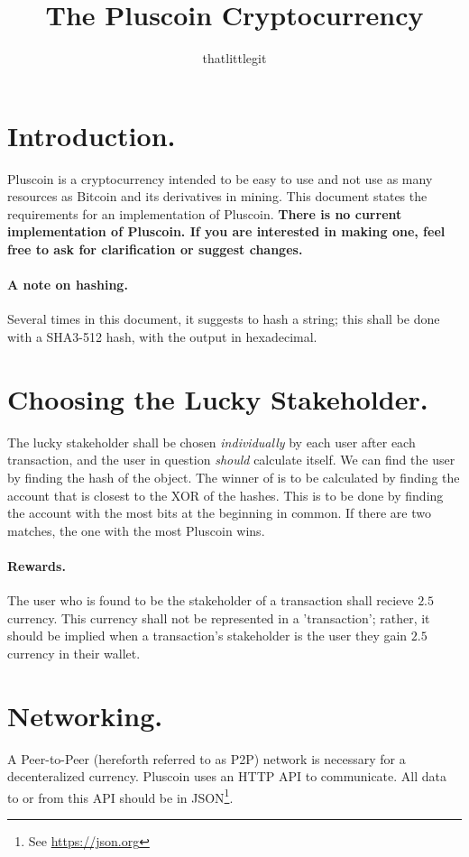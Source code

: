 \documentclass{article}
\title{The Pluscoin Cryptocurrency}
\author{thatlittlegit}
\date{}
\begin{document}
\maketitle
\tableofcontents
\newpage
{}

\section{Introduction.}
Pluscoin is a cryptocurrency intended to be easy to use and not use as many
resources as Bitcoin and its derivatives in mining. This document states the
requirements for an implementation of Pluscoin. \textbf{There is no current
implementation of Pluscoin. If you are interested in making one, feel free
to ask for clarification or suggest changes.}

\paragraph{A note on hashing.} Several times in this document, it suggests to
hash a string; this shall be done with a SHA3-512 hash, with the output in
hexadecimal.

\section{Choosing the Lucky Stakeholder.}
The lucky stakeholder shall be chosen {\it{individually}} by each user after
each transaction, and the user in question {\it{should}} calculate itself. We
can find the user by finding the hash of the object. The winner of is to be
calculated by finding the account that is closest to the XOR of the hashes.
This is to be done by finding the account with the most bits at the beginning
in common. If there are two matches, the one with the most Pluscoin wins.

\paragraph{Rewards.} The user who is found to be the stakeholder of a
transaction shall recieve $2.5$ currency. This currency shall not be
represented in a 'transaction'; rather, it should be implied when a
transaction's stakeholder is the user they gain $2.5$ currency in their wallet.

\label{net}
\section{Networking.}
A Peer-to-Peer (hereforth referred to as P2P) network is necessary for a
decenteralized currency. Pluscoin uses an HTTP API to communicate. All data to
or from this API should be in JSON\footnote{See \url{https://json.org}}.
\end{document}
